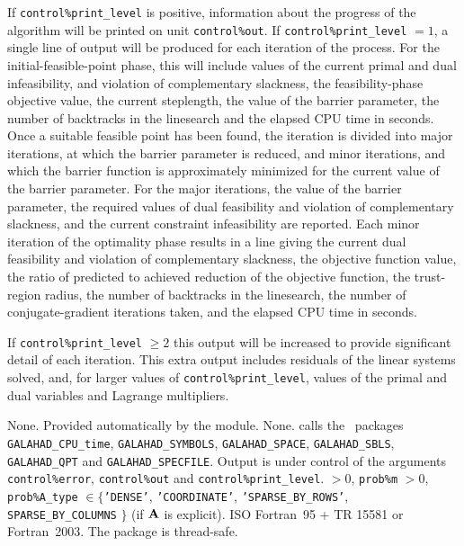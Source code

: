 \documentclass{galahad}
\newcommand{\packagename}{BLLS}
\begin{document}
\galinfo
If {\tt control\%print\_level} is positive, information about the progress
of the algorithm will be printed on unit {\tt control\-\%out}.
If {\tt control\%print\_level} $= 1$, a single line of output will be produced
for each iteration of the process.
For the initial-feasible-point phase,
this will include values of the current primal and dual infeasibility, and
violation of complementary slackness, the feasibility-phase objective value,
the current steplength, the value of the barrier parameter, the
number of backtracks in the linesearch and the elapsed CPU time in seconds.
Once a suitable feasible point has been found, the iteration is divided
into major iterations, at which the barrier parameter is reduced, and
minor iterations, and which the barrier function is approximately minimized
for the current value of the barrier parameter. For the major iterations,
the value of the barrier parameter, the required values of
dual feasibility and violation of complementary slackness, and the current
constraint infeasibility are reported. Each minor iteration of the
optimality phase results in a line giving
the current dual feasibility and violation of complementary slackness, the
objective function value, the ratio of predicted to achieved reduction
of the objective function, the trust-region radius, the
number of backtracks in the linesearch, the number of conjugate-gradient
iterations taken, and the elapsed CPU time in seconds.

If {\tt control\%print\_level} $\geq 2$ this
output will be increased to provide significant detail of each iteration.
This extra output includes residuals of the linear systems solved, and,
for larger values of {\tt control\%print\_level}, values of the primal and dual
variables and Lagrange multipliers.


\galgeneral

\galcommon None.
\galworkspace Provided automatically by the module.
\galroutines None.
\galmodules {\tt \packagename\_solve} calls the \galahad\ packages
{\tt GALAHAD\_CPU\_time},
{\tt GALAHAD\_SY\-M\-BOLS}, \newline
{\tt GALAHAD\_SPACE},
{\tt GALAHAD\_SBLS},
{\tt GALAHAD\_QPT} and
{\tt GALAHAD\_SPECFILE}.
\galio Output is under control of the arguments
 {\tt control\%error}, {\tt control\%out} and {\tt control\%print\_level}.
 $> 0$, {\tt prob\%m} $> 0$,
{\tt prob\%A\_type} $\in \{${\tt 'DENSE'},
 {\tt 'COORDINATE'}, {\tt 'SPARSE\_BY\_\-ROWS'},
 {\tt SPARSE\_BY\_COLUMNS} $\}$
(if ${\mathbf{A}}$ is explicit).
\galportability ISO Fortran~95 + TR 15581 or Fortran~2003.
The package is thread-safe.
\end{document}
